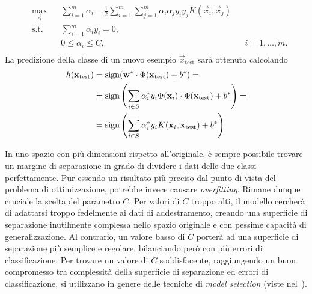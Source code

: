 \begin{equation}\label{eq:svc:softmargin:wolfe_dual_plus_kernel_trick}
\begin{aligned}
& \max_{\vec{\alpha}}    && \sum_{i=1}^{m}\alpha_i - \frac{1}{2}\sum_{i=1}^{m}\sum_{j=1}^{m}\alpha_i\alpha_jy_iy_jK(\Vec{x}_i, \Vec{x}_j)\\
& \textrm{s.t.} && \sum_{i=1}^{m} \alpha_iy_i = 0, \\
&               && 0 \leq \alpha_i \leq C, && i=1,\dots,m. \\
\end{aligned}
\end{equation}
%
La predizione della classe di un nuovo esempio $\Vec{x}_\text{test}$ sarà ottenuta calcolando 
\begin{align*}
h(\Vec{x}_\text{test})  &= \sign(\Vec{w}^*\cdot\Phi(\vec{x}_{\text{test}}) +b^*) =\\
                        &= \sign\left(\sum_{i\in S} \alpha_i^*y_i \Phi(\vec{x}_i) \cdot \Phi(\vec{x}_{\text{test}}) + b^*\right)=\\
                        &= \sign\left(\sum_{i \in S}\alpha_i^*y_iK(\Vec{x}_i, \Vec{x}_\text{test}) + b^*\right)
\end{align*}

In uno spazio con più dimensioni rispetto all'originale, è sempre possibile trovare un margine di separazione in grado di dividere i dati delle due classi perfettamente. %
Pur essendo un risultato più preciso dal punto di vista del problema di ottimizzazione, potrebbe invece causare \emph{overfitting}. Rimane dunque cruciale la scelta del parametro $C$. 
Per valori di $C$ troppo alti, il modello cercherà di adattarsi troppo fedelmente ai dati di addestramento, creando una superficie di separazione inutilmente complessa nello spazio originale e con pessime capacità di generalizzazione. 
Al contrario, un valore basso di $C$ porterà ad una superficie di separazione più semplice e regolare, bilanciando però con più errori di classificazione. 
Per trovare un valore di $C$ soddisfacente, raggiungendo un buon compromesso tra complessità della superficie di separazione ed errori di classificazione, si utilizzano in genere delle tecniche di \emph{model selection} (viste nel~).  


